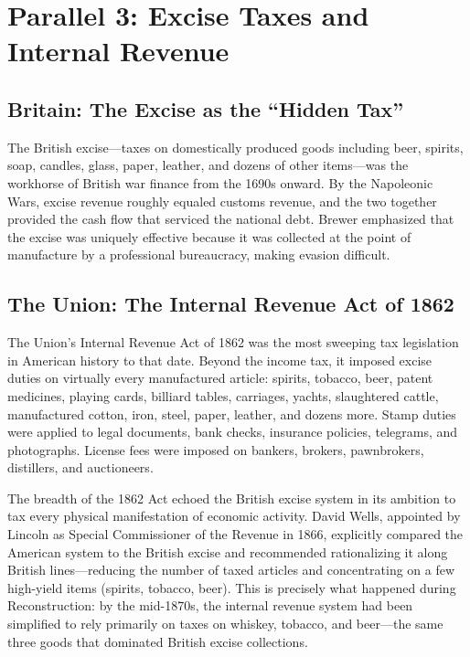 \documentclass[12pt]{article}
\begin{document}
\section{Parallel 3: Excise Taxes and Internal Revenue}
\label{sec:excise}

\subsection{Britain: The Excise as the ``Hidden Tax''}

The British excise---taxes on domestically produced goods including beer,
spirits, soap, candles, glass, paper, leather, and dozens of other
items---was the workhorse of British war finance from the 1690s onward.
By the Napoleonic Wars, excise revenue roughly equaled customs revenue,
and the two together provided the cash flow that serviced the national
debt. Brewer emphasized that the excise was uniquely effective because
it was collected at the point of manufacture by a professional
bureaucracy, making evasion difficult.

\subsection{The Union: The Internal Revenue Act of 1862}

The Union's Internal Revenue Act of 1862 was the most sweeping tax
legislation in American history to that date. Beyond the income tax, it
imposed excise duties on virtually every manufactured article: spirits,
tobacco, beer, patent medicines, playing cards, billiard tables,
carriages, yachts, slaughtered cattle, manufactured cotton, iron, steel,
paper, leather, and dozens more. Stamp duties were applied to legal
documents, bank checks, insurance policies, telegrams, and photographs.
License fees were imposed on bankers, brokers, pawnbrokers, distillers,
and auctioneers.

The breadth of the 1862 Act echoed the British excise system in its
ambition to tax every physical manifestation of economic activity. David
Wells, appointed by Lincoln as Special Commissioner of the Revenue in
1866, explicitly compared the American system to the British excise and
recommended rationalizing it along British lines---reducing the number
of taxed articles and concentrating on a few high-yield items (spirits,
tobacco, beer). This is precisely what happened during Reconstruction:
by the mid-1870s, the internal revenue system had been simplified to
rely primarily on taxes on whiskey, tobacco, and beer---the same three
goods that dominated British excise collections.
\end{document}
